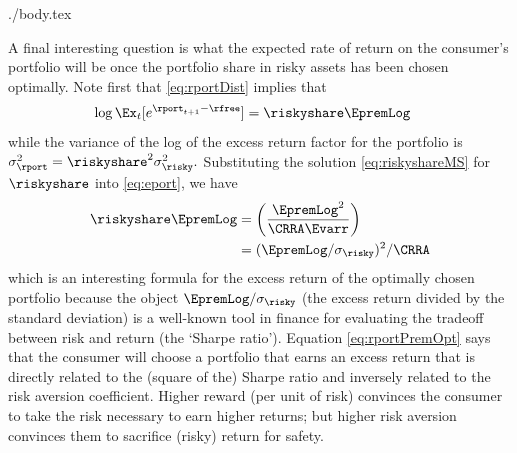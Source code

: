 \documentclass{\handout}
\begin{document}
\begin{verbatimwrite}{./body.tex}


A final interesting question is what the expected rate of return on
the consumer's portfolio will be once the portfolio share in risky
assets has been chosen optimally.  Note first that \eqref{eq:rportDist}
implies that 
\begin{equation}\begin{gathered}\begin{aligned}
  \log \Ex_{t}[e^{\rport_{t+1}-\rfree}] & =  \riskyshare \EpremLog  \label{eq:eport}
\end{aligned}\end{gathered}\end{equation}
while the variance of the log of the excess return factor for the portfolio is $\sigma^{2}_{\rport} = \riskyshare^{2} \sigma^{2}_{\risky}.$  Substituting the solution \eqref{eq:riskyshareMS} for $\riskyshare$ into \eqref{eq:eport}, we have
\begin{equation}\begin{gathered}\begin{aligned}
  \riskyshare \EpremLog & =  \left(\frac{\EpremLog^{2}}{\CRRA \Evarr}\right)  
\\ & =   (\EpremLog/\sigma_{\risky})^{2}/\CRRA \label{eq:rportPremOpt}
\end{aligned}\end{gathered}\end{equation}
which is an interesting formula for the excess return of the optimally
chosen portfolio because the object $\EpremLog/\sigma_{\risky}$ (the
excess return divided by the standard deviation) is a well-known tool
in finance for evaluating the tradeoff between risk and return (the
`Sharpe ratio').  Equation \eqref{eq:rportPremOpt} says that the consumer will
choose a portfolio that earns an excess return that is directly
related to the (square of the) Sharpe ratio and inversely related to the risk aversion
coefficient.  Higher reward (per unit of risk) convinces the consumer
to take the risk necessary to earn higher returns; but higher risk
aversion convinces them to sacrifice (risky) return for safety.


\end{verbatimwrite}
\end{document}
